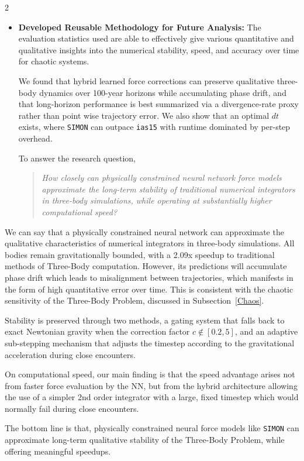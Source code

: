 \documentclass{article}
\begin{document}
\begin{multicols}{2}
\begin{itemize}
    \item \textbf{Developed Reusable Methodology for Future Analysis:} The evaluation statistics used are able to effectively give various quantitative and qualitative insights into the numerical stability, speed, and accuracy over time for chaotic systems.

We found that hybrid learned force corrections can preserve qualitative three-body dynamics over 100-year horizons while accumulating phase drift, and that long-horizon performance is best summarized via a divergence-rate proxy rather than point wise trajectory error. We also show that an optimal $dt$ exists, where \texttt{SIMON} can outpace \texttt{ias15} with runtime dominated by per-step overhead.

To answer the research question, 

\begin{quote}
\emph{How closely can physically constrained neural network force models approximate the long-term stability of traditional numerical integrators in three-body simulations, while operating at substantially higher computational speed?}
\end{quote}
\end{itemize}

We can say that a physically constrained neural network can approximate the qualitative characteristics of numerical integrators in three-body simulations. All bodies remain gravitationally bounded, with a 2.09x speedup to traditional methods of Three-Body computation. However, its predictions will accumulate phase drift which leads to misalignment between trajectories, which manifests in the form of high quantitative error over time. This is consistent with the chaotic sensitivity of the Three-Body Problem, discussed in Subsection~\ref{Chaos}.

Stability is preserved through two methods, a gating system that falls back to exact Newtonian gravity when the correction factor $c \notin [0.2, 5]$, and an adaptive sub-stepping mechanism that adjusts the timestep according to the gravitational acceleration during close encounters.

On computational speed, our main finding is that the speed advantage arises not from faster force evaluation by the NN, but from the hybrid architecture allowing the use of a simpler 2nd order integrator with a large, fixed timestep which would normally fail during close encounters.

The bottom line is that, physically constrained neural force models like \texttt{SIMON} can approximate long-term qualitative stability of the Three-Body Problem, while offering meaningful speedups.
 
{}
\end{multicols}
\end{document}
